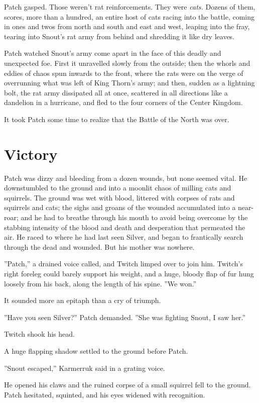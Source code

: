 \documentclass[12pt]{book}
\begin{document}
Patch gasped. Those weren't rat reinforcements. They were
\textit{cats.} Dozens of them, scores, more than a hundred, an entire
host of cats racing into the battle, coming in ones and twos from
north and south and east and west, leaping into the fray, tearing into
Snout's rat army from behind and shredding it like dry leaves.

Patch watched Snout's army come apart in the face of this deadly and
unexpected foe. First it unravelled slowly from the outside; then the
whorls and eddies of chaos spun inwards to the front, where the rats
were on the verge of overrunning what was left of King Thorn's army;
and then, sudden as a lightning bolt, the rat army dissipated all at
once, scattered in all directions like a dandelion in a hurricane, and
fled to the four corners of the Center Kingdom.

It took Patch some time to realize that the Battle of the North was
over.


\section{Victory}

Patch was dizzy and bleeding from a dozen wounds, but none seemed
vital. He downstumbled to the ground and into a moonlit chaos of
milling cats and squirrels. The ground was wet with blood, littered
with corpses of rats and squirrels and cats; the sighs and groans of
the wounded accumulated into a near-roar; and he had to breathe
through his mouth to avoid being overcome by the stabbing intensity of
the blood and death and desperation that permeated the air. He raced
to where he had last seen Silver, and began to frantically search
through the dead and wounded. But his mother was nowhere.

''Patch,'' a drained voice called, and Twitch limped over to join
him. Twitch's right foreleg could barely support his weight, and a
huge, bloody flap of fur hung loosely from his back, along the length
of his spine. ''We won.''

It sounded more an epitaph than a cry of triumph.

''Have you seen Silver?'' Patch demanded. ''She was fighting Snout, I
saw her.''

Twitch shook his head.

A huge flapping shadow settled to the ground before Patch.

''Snout escaped,'' Karmerruk said in a grating voice.

He opened his claws and the ruined corpse of a small squirrel fell to
the ground. Patch hesitated, squinted, and his eyes widened with
recognition.
\end{document}
